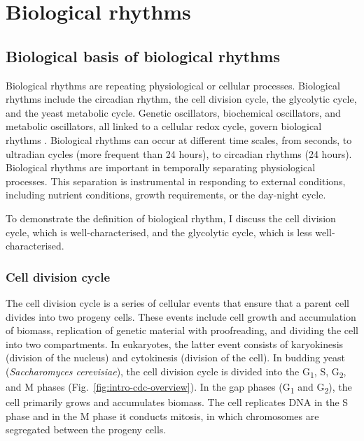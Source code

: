 \section{Biological rhythms}
\label{sec:intro-biological_rhythms}

\subsection{Biological basis of biological rhythms}
\label{subsec:intro-biological_rhythms-biological_basis}

Biological rhythms are repeating physiological or cellular processes.
Biological rhythms include the circadian rhythm, the cell division cycle, the glycolytic cycle, and the yeast metabolic cycle.
Genetic oscillators, biochemical oscillators, and metabolic oscillators, all linked to a cellular redox cycle, govern biological rhythms \parencite{mellorMolecularBasisMetabolic2016}.
Biological rhythms can occur at different time scales, from seconds, to ultradian cycles (more frequent than 24 hours), to circadian rhythms (24 hours).
Biological rhythms are important in temporally separating physiological processes.
This separation is instrumental in responding to external conditions, including nutrient conditions, growth requirements, or the day-night cycle.

To demonstrate the definition of biological rhythm, I discuss the cell division cycle, which is well-char\-ac\-terised, and the glycolytic cycle, which is less well-characterised.


\subsubsection{Cell division cycle}
\label{subsubsec:intro-cdc}

The cell division cycle is a series of cellular events that ensure that a parent cell divides into two progeny cells.
These events include cell growth and accumulation of biomass, replication of genetic material with proofreading, and dividing the cell into two compartments.
In eukaryotes, the latter event consists of karyokinesis (division of the nucleus) and cytokinesis (division of the cell).
In budding yeast (\textit{Saccharomyces cerevisiae}), the cell division cycle is divided into the G\textsubscript{1}, S, G\textsubscript{2}, and M phases (Fig.\ \ref{fig:intro-cdc-overview}).
In the gap phases (G\textsubscript{1} and G\textsubscript{2}), the cell primarily grows and accumulates biomass.
The cell replicates DNA in the S phase and in the M phase it conducts mitosis, in which chromosomes are segregated between the progeny cells.

